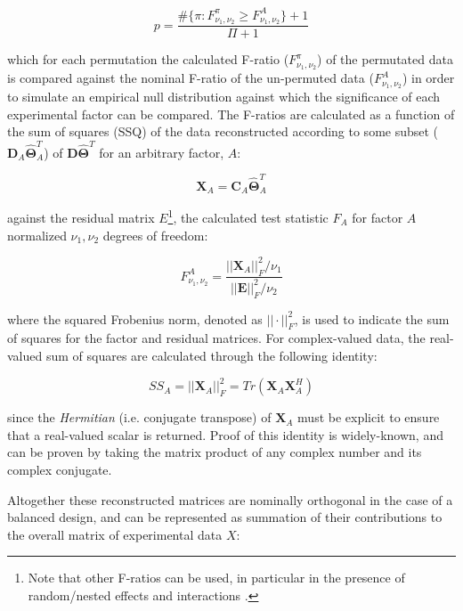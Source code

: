 \documentclass[preprint,12pt]{elsarticle}
\begin{document}
\begin{equation}
p = \frac{\#\{\pi:F^\pi_{\nu_1,\nu_2} \geq F^{A}_{\nu_1,\nu_2}\} + 1}{\Pi+1}
\end{equation}

\noindent which for each permutation the calculated F-ratio ($F^\pi_{\nu_1,\nu_2}$) of the permutated data is compared against the nominal F-ratio of the un-permuted data ($F^{A}_{\nu_1,\nu_2}$) in order to simulate an empirical null distribution against which the significance of each experimental factor can be compared. The F-ratios are calculated as a function of the sum of squares (SSQ) of the data reconstructed according to some subset ($\mathbf{D}_A\mathbf{\hat{\Theta}}_A^T$) of $\mathbf{D}\mathbf{\hat{\Theta}}^T$ for an arbitrary factor, $A$:

\begin{equation}
    \mathbf{X}_A = \mathbf{C}_A\mathbf{\hat{\Theta}}^T_A
\end{equation}

\noindent against the residual matrix $E$\footnote{Note that other F-ratios can be used, in particular in the presence of random/nested effects and interactions \cite{anderson2014permutational}.}, the calculated test statistic $F_A$ for factor $A$ normalized $\nu_1, \nu_2$ degrees of freedom:

 \begin{equation}\label{eq:sig_test}
    F^A_{\nu_1,\nu_2} = \frac{||\mathbf{X}_A||_F^2/\nu_1}{||\mathbf{E}||^2_F/\nu_2}
\end{equation}

\noindent where the squared Frobenius norm, denoted as $||\cdot||^2_F$, is used to indicate the sum of squares for the factor and residual matrices. For complex-valued data, the real-valued sum of squares are calculated through the following identity:

\begin{equation}\label{eq:ssq}
    SS_A = ||\mathbf{X}_A||^2_F = Tr(\mathbf{X}_A\mathbf{X}_A^H)
\end{equation}

\noindent since the \textit{Hermitian} (i.e. conjugate transpose) of $\mathbf{X}_A$ must be explicit to ensure that a real-valued scalar is returned. Proof of this identity is widely-known, and can be proven by taking the matrix product of any complex number and its complex conjugate.

Altogether these reconstructed matrices are nominally orthogonal in the case of a balanced design, and can be represented as summation of their contributions to the overall matrix of experimental data $X$:
\end{document}
